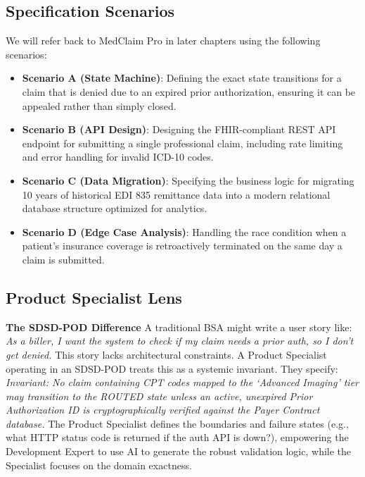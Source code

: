 \documentclass[
  11pt,
  openany,
  oneside]{book}
\providecommand{\tightlist}{%
  \setlength{\itemsep}{0pt}\setlength{\parskip}{0pt}}
\renewenvironment{quote}{\begin{customquote}}{\end{customquote}}
\begin{document}
\subsection{Specification Scenarios}\label{specification-scenarios}

We will refer back to MedClaim Pro in later chapters using the following
scenarios:

\begin{itemize}
\tightlist
\item
  \textbf{Scenario A (State Machine)}: Defining the exact state
  transitions for a claim that is denied due to an expired prior
  authorization, ensuring it can be appealed rather than simply closed.
\item
  \textbf{Scenario B (API Design)}: Designing the FHIR-compliant REST
  API endpoint for submitting a single professional claim, including
  rate limiting and error handling for invalid ICD-10 codes.
\item
  \textbf{Scenario C (Data Migration)}: Specifying the business logic
  for migrating 10 years of historical EDI 835 remittance data into a
  modern relational database structure optimized for analytics.
\item
  \textbf{Scenario D (Edge Case Analysis)}: Handling the race condition
  when a patient's insurance coverage is retroactively terminated on the
  same day a claim is submitted.
\end{itemize}

\subsection{Product Specialist Lens}\label{product-specialist-lens}

\begin{quote}
\textbf{The SDSD-POD Difference} A traditional BSA might write a user
story like: \emph{As a biller, I want the system to check if my claim
needs a prior auth, so I don't get denied.} This story lacks
architectural constraints. A Product Specialist operating in an SDSD-POD
treats this as a systemic invariant. They specify: \emph{Invariant: No
claim containing CPT codes mapped to the `Advanced Imaging' tier may
transition to the ROUTED state unless an active, unexpired Prior
Authorization ID is cryptographically verified against the Payer
Contract database.} The Product Specialist defines the boundaries and
failure states (e.g., what HTTP status code is returned if the auth API
is down?), empowering the Development Expert to use AI to generate the
robust validation logic, while the Specialist focuses on the domain
exactness.
\end{quote}
\end{document}
